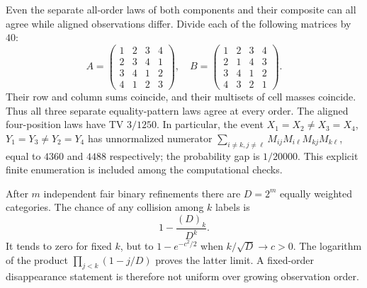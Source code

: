 Even the separate all-order laws of both components and their composite can all agree while aligned observations differ. Divide each of the following matrices by $40$:
\[
 A=\begin{pmatrix}1&2&3&4\\2&3&4&1\\3&4&1&2\\4&1&2&3\end{pmatrix},\quad
 B=\begin{pmatrix}1&2&3&4\\2&1&4&3\\3&4&1&2\\4&3&2&1\end{pmatrix}.
\]
Their row and column sums coincide, and their multisets of cell masses coincide. Thus all three separate equality-pattern laws agree at every order. The aligned four-position laws have TV $3/1250$. In particular, the event
$X_1=X_2\ne X_3=X_4$, $Y_1=Y_3\ne Y_2=Y_4$
has unnormalized numerator
$\sum_{i\ne k,j\ne\ell}M_{ij}M_{i\ell}M_{kj}M_{k\ell}$,
equal to $4360$ and $4488$ respectively; the probability gap is $1/20000$. This explicit finite enumeration is included among the computational checks.

After $m$ independent fair binary refinements there are $D=2^m$ equally weighted categories. The chance of any collision among $k$ labels is
\[
 1-\frac{(D)_k}{D^k}.
\]
It tends to zero for fixed $k$, but to $1-e^{-c^2/2}$ when $k/\sqrt D\to c>0$. The logarithm of the product $\prod_{j<k}(1-j/D)$ proves the latter limit. A fixed-order disappearance statement is therefore not uniform over growing observation order.

